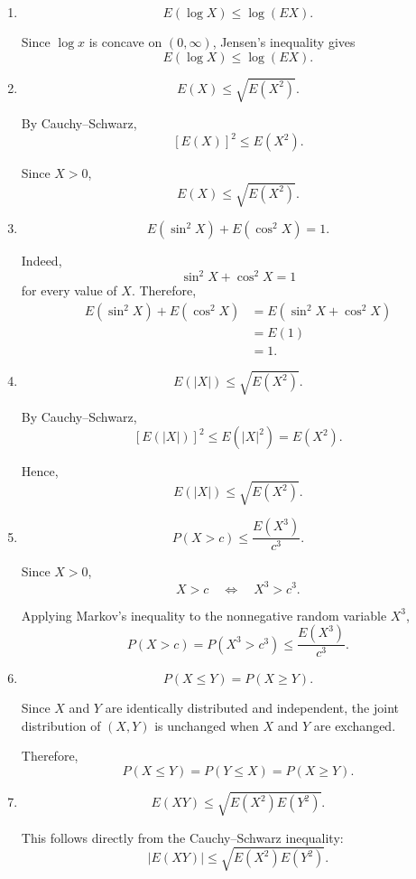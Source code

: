 \documentclass[11pt]{article}
\newenvironment{solution}{
    \par
    \begin{tcolorbox}[
        colback=white,
        colframe=uwgold,
        boxrule=0.7pt,
        arc=2mm,
        left=3mm,
        right=3mm,
        top=2mm,
        bottom=2mm,
        breakable,
        before skip=0.5em,
        after skip=1em,
        title=\textbf{Solution},
        coltitle=uwpurple,
        fonttitle=\bfseries
    ]
}{
    \end{tcolorbox}
}
\begin{document}
\begin{solution}

\begin{enumerate}[label=(\alph*)]

\item
\[
E(\log X)\leq \log(E X).
\]

Since \(\log x\) is concave on \((0,\infty)\), Jensen's inequality gives
\[
E(\log X)\leq \log(E X).
\]


\item
\[
E(X)\leq \sqrt{E(X^2)}.
\]

By Cauchy--Schwarz,
\[
[E(X)]^2\leq E(X^2).
\]

Since \(X>0\),
\[
E(X)\leq \sqrt{E(X^2)}.
\]


\item
\[
E(\sin^2 X)+E(\cos^2 X)=1.
\]

Indeed,
\[
\sin^2 X+\cos^2 X=1
\]
for every value of \(X\). Therefore,
\[
\begin{aligned}
E(\sin^2 X)+E(\cos^2 X)
&=
E(\sin^2 X+\cos^2 X)\\
&=
E(1)\\
&=
1.
\end{aligned}
\]


\item
\[
E(|X|)\leq \sqrt{E(X^2)}.
\]

By Cauchy--Schwarz,
\[
[E(|X|)]^2
\leq
E(|X|^2)
=
E(X^2).
\]

Hence,
\[
E(|X|)
\leq
\sqrt{E(X^2)}.
\]


\item
\[
P(X>c)\leq \frac{E(X^3)}{c^3}.
\]

Since \(X>0\),
\[
X>c
\quad\Longleftrightarrow\quad
X^3>c^3.
\]

Applying Markov's inequality to the nonnegative random variable \(X^3\),
\[
P(X>c)
=
P(X^3>c^3)
\leq
\frac{E(X^3)}{c^3}.
\]


\item
\[
P(X\leq Y)=P(X\geq Y).
\]

Since \(X\) and \(Y\) are identically distributed and independent, the joint
distribution of \((X,Y)\) is unchanged when \(X\) and \(Y\) are exchanged.

Therefore,
\[
P(X\leq Y)=P(Y\leq X)=P(X\geq Y).
\]


\item
\[
E(XY)\leq \sqrt{E(X^2)E(Y^2)}.
\]

This follows directly from the Cauchy--Schwarz inequality:
\[
|E(XY)|
\leq
\sqrt{E(X^2)E(Y^2)}.
\]


\end{enumerate}
\end{solution}
\end{document}
